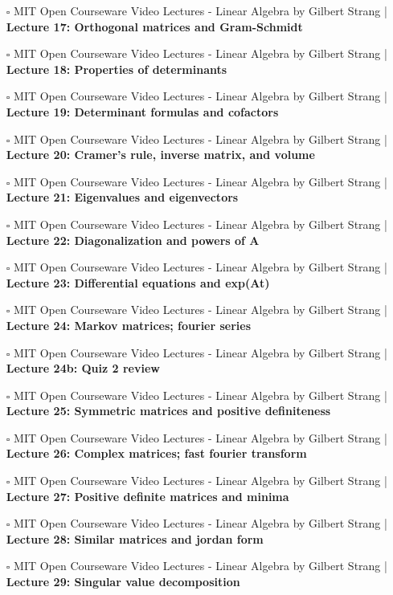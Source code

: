 \documentclass[a4, landscape, 12pt]{article}
\newcommand{\checkbox}{$\square$}%
\begin{document}
\begin{itemize}
{}
\item [\checkbox] MIT Open Courseware Video Lectures - Linear Algebra by Gilbert Strang  | \textbf{Lecture 17: Orthogonal matrices and Gram-Schmidt
}
\item [\checkbox] MIT Open Courseware Video Lectures - Linear Algebra by Gilbert Strang  | \textbf{Lecture 18: Properties of determinants
}
\item [\checkbox] MIT Open Courseware Video Lectures - Linear Algebra by Gilbert Strang  | \textbf{Lecture 19: Determinant formulas and cofactors
}
\item [\checkbox] MIT Open Courseware Video Lectures - Linear Algebra by Gilbert Strang  | \textbf{Lecture 20: Cramer's rule, inverse matrix, and volume
}
\item [\checkbox] MIT Open Courseware Video Lectures - Linear Algebra by Gilbert Strang  | \textbf{Lecture 21: Eigenvalues and eigenvectors
}
\item [\checkbox] MIT Open Courseware Video Lectures - Linear Algebra by Gilbert Strang  | \textbf{Lecture 22: Diagonalization and powers of A
}
\item [\checkbox] MIT Open Courseware Video Lectures - Linear Algebra by Gilbert Strang  | \textbf{Lecture 23: Differential equations and exp(At)
}
\item [\checkbox] MIT Open Courseware Video Lectures - Linear Algebra by Gilbert Strang  | \textbf{Lecture 24: Markov matrices; fourier series
}
\item [\checkbox] MIT Open Courseware Video Lectures - Linear Algebra by Gilbert Strang  | \textbf{Lecture 24b: Quiz 2 review
}
\item [\checkbox] MIT Open Courseware Video Lectures - Linear Algebra by Gilbert Strang  | \textbf{Lecture 25: Symmetric matrices and positive definiteness
}
\item [\checkbox] MIT Open Courseware Video Lectures - Linear Algebra by Gilbert Strang  | \textbf{Lecture 26: Complex matrices; fast fourier transform
}
\item [\checkbox] MIT Open Courseware Video Lectures - Linear Algebra by Gilbert Strang  | \textbf{Lecture 27: Positive definite matrices and minima
}
\item [\checkbox] MIT Open Courseware Video Lectures - Linear Algebra by Gilbert Strang  | \textbf{Lecture 28: Similar matrices and jordan form
}
\item [\checkbox] MIT Open Courseware Video Lectures - Linear Algebra by Gilbert Strang  | \textbf{Lecture 29: Singular value decomposition
}
\end{itemize}
\end{document}
